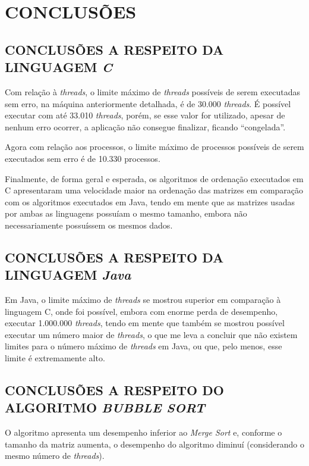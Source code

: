 \section{\normalsize CONCLUSÕES}
	
	\subsection{\normalsize CONCLUSÕES A RESPEITO DA LINGUAGEM \textit{C}}
		Com relação à \textit{threads}, o limite máximo de \textit{threads} possíveis de serem executadas sem erro, na máquina anteriormente detalhada, é de 30.000 \textit{threads}. É possível executar com até 33.010 \textit{threads}, porém, se esse valor for utilizado, apesar de nenhum erro ocorrer, a aplicação não consegue finalizar, ficando ``congelada''.
		
		Agora com relação aos processos, o limite máximo de processos possíveis de serem executados sem erro é de 10.330 processos.
		
		Finalmente, de forma geral e esperada, os algoritmos de ordenação executados em C apresentaram uma velocidade maior na ordenação das matrizes em comparação com os algoritmos executados em Java, tendo em mente que as matrizes usadas por ambas as linguagens possuíam o mesmo tamanho, embora não necessariamente possuíssem os mesmos dados.
		 
	\subsection{\normalsize CONCLUSÕES A RESPEITO DA LINGUAGEM \textit{Java}}
		Em Java, o limite máximo de \textit{threads} se mostrou superior em comparação à linguagem C, onde foi possível, embora com enorme perda de desempenho, executar 1.000.000 \textit{threads}, tendo em mente que também se mostrou possível executar um número maior de \textit{threads}, o que me leva a concluir que não existem limites para o número máximo de \textit{threads} em Java, ou que, pelo menos, esse limite é extremamente alto.
	
	\subsection{\normalsize CONCLUSÕES A RESPEITO DO ALGORITMO \textit{BUBBLE SORT}}
		O algoritmo apresenta um desempenho inferior ao \textit{Merge Sort} e, conforme o tamanho da matriz aumenta, o desempenho do algoritmo diminuí (considerando o mesmo número de \textit{threads}). 
		
